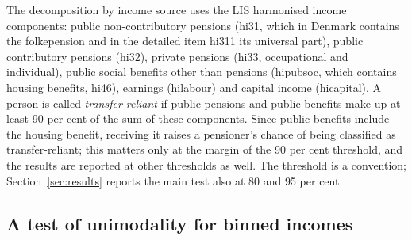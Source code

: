 The decomposition by income source uses the LIS harmonised income components: public non-contributory pensions (hi31, which in Denmark contains the folkepension and in the detailed item hi311 its universal part), public contributory pensions (hi32), private pensions (hi33, occupational and individual), public social benefits other than pensions (hipubsoc, which contains housing benefits, hi46), earnings (hilabour) and capital income (hicapital). A person is called \emph{transfer-reliant} if public pensions and public benefits make up at least 90 per cent of the sum of these components. Since public benefits include the housing benefit, receiving it raises a pensioner's chance of being classified as transfer-reliant; this matters only at the margin of the 90 per cent threshold, and the results are reported at other thresholds as well. The threshold is a convention; Section~\ref{sec:results} reports the main test also at 80 and 95 per cent.

\subsection{A test of unimodality for binned incomes}

